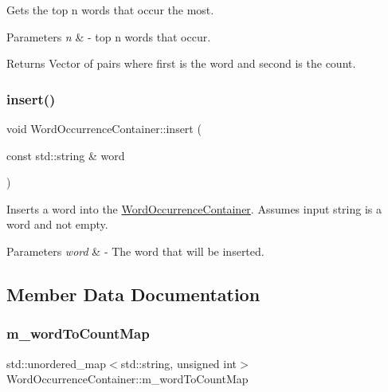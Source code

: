 Gets the top n words that occur the most. 


\begin{DoxyParams}{Parameters}
{\em n} & -\/ top n words that occur. \\
\hline
\end{DoxyParams}
\begin{DoxyReturn}{Returns}
Vector of pairs where first is the word and second is the count. 
\end{DoxyReturn}
\mbox{\label{class_word_occurrence_container_a3ea24956cdbd599593bd4c0256cf9d15}} 
\subsubsection{\texorpdfstring{insert()}{insert()}}
{\footnotesize\ttfamily void Word\+Occurrence\+Container\+::insert (\begin{DoxyParamCaption}\item[{const std\+::string \&}]{word }\end{DoxyParamCaption})}



Inserts a word into the \mbox{\hyperlink{class_word_occurrence_container}{Word\+Occurrence\+Container}}. Assumes input string is a word and not empty. 


\begin{DoxyParams}{Parameters}
{\em word} & -\/ The word that will be inserted. \\
\hline
\end{DoxyParams}


\subsection{Member Data Documentation}
\mbox{\label{class_word_occurrence_container_ab2f0abb68fe94056659c7a1e0f919ae2}} 
\subsubsection{\texorpdfstring{m\+\_\+word\+To\+Count\+Map}{m\_wordToCountMap}}
{\footnotesize\ttfamily std\+::unordered\+\_\+map$<$std\+::string, unsigned int$>$ Word\+Occurrence\+Container\+::m\+\_\+word\+To\+Count\+Map\hspace{0.3cm}{\ttfamily [private]}}

